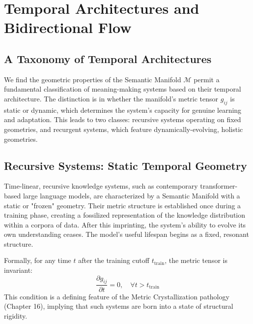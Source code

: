 \chapter{Temporal Architectures and Bidirectional Flow}


\section{A Taxonomy of Temporal Architectures}

We find the geometric properties of the Semantic Manifold \(\mathcal{M}\) permit a fundamental classification of meaning-making systems based on their temporal architecture. The distinction is in whether the manifold's metric tensor \(g_{ij}\) is static or dynamic, which determines the system's capacity for genuine learning and adaptation. This leads to two classes: recursive systems operating on fixed geometries, and recurgent systems, which feature dynamically-evolving, holistic geometries.


\section{Recursive Systems: Static Temporal Geometry}

Time-linear, recursive knowledge systems, such as contemporary transformer-based large language models, are characterized by a Semantic Manifold with a static or "frozen" geometry. Their metric structure is established once during a training phase, creating a fossilized representation of the knowledge distribution within a corpora of data. After this imprinting, the system's ability to evolve its own understanding ceases. The model's useful lifespan begins as a fixed, resonant structure.

Formally, for any time \(t\) after the training cutoff \(t_{\text{train}}\), the metric tensor is invariant:
\begin{equation}
\frac{\partial g_{ij}}{\partial t} = 0, \quad \forall t > t_{\text{train}}
\end{equation}
This condition is a defining feature of the Metric Crystallization pathology (Chapter 16), implying that such systems are born into a state of structural rigidity.

